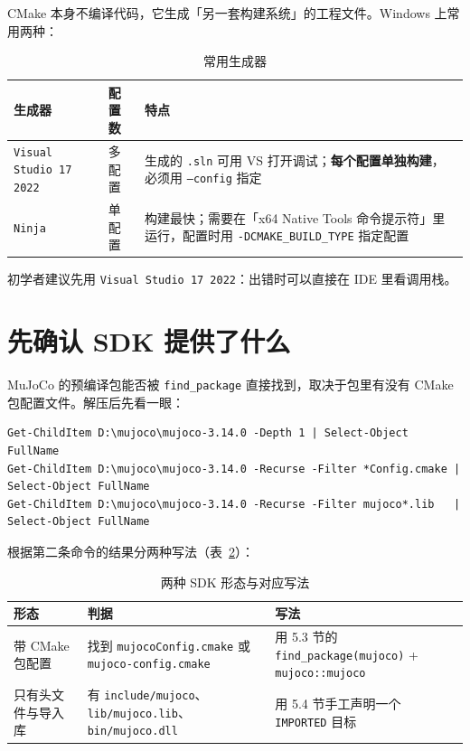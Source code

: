 CMake 本身不编译代码，它生成「另一套构建系统」的工程文件。Windows 上常用两种：

\begin{table}[H]
	\centering
	\caption{常用生成器}
	\label{tab:CMake:生成器}
	\footnotesize
	\begin{tabular}{>{\raggedright\arraybackslash}p{4.6cm}>{\raggedright\arraybackslash}p{2.6cm}>{\raggedright\arraybackslash}p{6.8cm}}
		\hline
		生成器 & 配置数 & 特点 \\
		\hline
		\texttt{Visual Studio 17 2022} & 多配置 & 生成的 \texttt{.sln} 可用 VS 打开调试；\textbf{每个配置单独构建}，必须用 \texttt{--config} 指定 \\
		\texttt{Ninja} & 单配置 & 构建最快；需要在「x64 Native Tools 命令提示符」里运行，配置时用 \texttt{-DCMAKE\_BUILD\_TYPE} 指定配置 \\
		\hline
	\end{tabular}
\end{table}

初学者建议先用 \texttt{Visual Studio 17 2022}：出错时可以直接在 IDE 里看调用栈。

\section{先确认 SDK 提供了什么}

MuJoCo 的预编译包能否被 \texttt{find\_package} 直接找到，取决于包里有没有 CMake 包配置文件。解压后先看一眼：

\begin{lstlisting}[style=shell]
Get-ChildItem D:\mujoco\mujoco-3.14.0 -Depth 1 | Select-Object FullName
Get-ChildItem D:\mujoco\mujoco-3.14.0 -Recurse -Filter *Config.cmake | Select-Object FullName
Get-ChildItem D:\mujoco\mujoco-3.14.0 -Recurse -Filter mujoco*.lib   | Select-Object FullName
\end{lstlisting}

根据第二条命令的结果分两种写法（表~\ref{tab:CMake:两种形态}）：

\begin{table}[H]
	\centering
	\caption{两种 SDK 形态与对应写法}
	\label{tab:CMake:两种形态}
	\footnotesize
	\begin{tabular}{>{\raggedright\arraybackslash}p{3.6cm}>{\raggedright\arraybackslash}p{5.0cm}>{\raggedright\arraybackslash}p{5.4cm}}
		\hline
		形态 & 判据 & 写法 \\
		\hline
		带 CMake 包配置 & 找到 \texttt{mujocoConfig.cmake} 或 \texttt{mujoco-config.cmake} & 用 5.3 节的 \texttt{find\_package(mujoco)} + \texttt{mujoco::mujoco} \\
		只有头文件与导入库 & 有 \texttt{include/mujoco}、\texttt{lib/mujoco.lib}、\texttt{bin/mujoco.dll} & 用 5.4 节手工声明一个 \texttt{IMPORTED} 目标 \\
		\hline
	\end{tabular}
\end{table}

